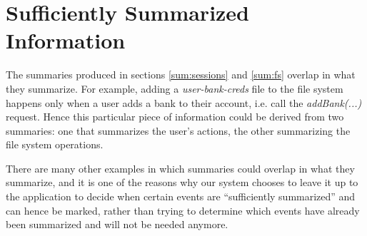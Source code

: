 \section{Sufficiently Summarized Information}

The summaries produced in sections \ref{sum:sessions} and \ref{sum:fs} overlap in what they summarize. For example, adding a \emph{user-bank-creds} file to the file system happens only when a user adds a bank to their account, i.e. call the \emph{addBank(...)} request. Hence this particular piece of information could be derived from two summaries: one that summarizes the user's actions, the other summarizing the file system operations.

There are many other examples in which summaries could overlap in what they summarize, and it is one of the reasons why our system chooses to leave it up to the application to decide when certain events are ``sufficiently summarized'' and can hence be marked, rather than trying to determine which events have already been summarized and will not be needed anymore.
